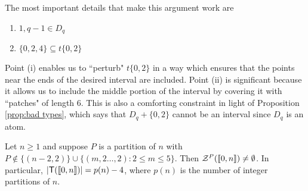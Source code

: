\begin{rk}
	The most important details that make this argument work are
	\begin{enumerate}[label={\rm (\roman{*})}]
		\item $1,q-1\in D_q$
		\item $\{0,2,4\} \subseteq t\{0,2\}$
	\end{enumerate}
	Point (i) enables us to ``perturb" $t\{0,2\}$ in a way which ensures that the points near the ends of the desired interval are included.
	Point (ii) is significant because it allows us to include the middle portion of the interval by covering it with ``patches" of length $6$.
	This is also a comforting constraint in light of Proposition \ref{prop:bad types}, which says that $D_q + \{0,2\}$ cannot be an interval since $D_q$ is an atom.
\end{rk}


\begin{thm} \label{thm:good types}
	Let $n\ge 1$ and suppose $P$ is a partition of $n$ with $P \notin \{(n-2,2)\} \cup \{ (m,2\dots,2) : 2\le m \le 5\}$.
	Then $\mathcal{Z}^P(\llbracket 0,n \rrbracket) \neq \emptyset$.
	In particular, $|\mathsf{T}(\llbracket 0,n \rrbracket)| = p(n)-4$, where $p(n)$ is the number of integer partitions of $n$.
\end{thm}


